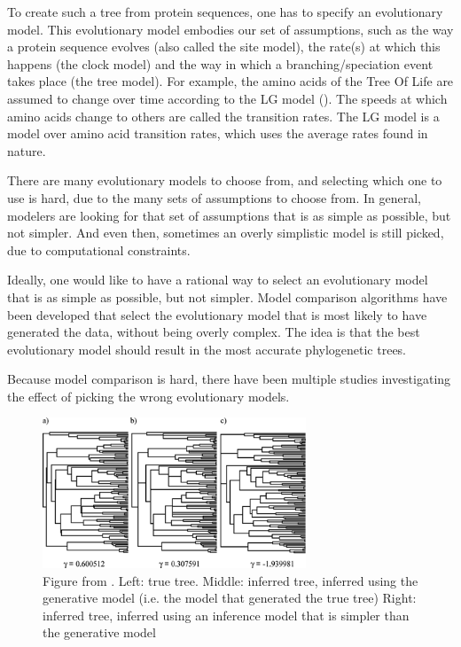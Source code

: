 To create such a tree from protein sequences, one has to specify
an evolutionary model. This evolutionary model embodies our set of
assumptions,
such as the way a protein sequence evolves (also called the site model), 
the rate(s) at which this happens (the clock model) 
and the way in which a branching/speciation event takes 
place (the tree model). 
For example, the amino acids of the Tree Of Life are assumed to change
over time according to the LG model (\cite{le2008improved}).
The speeds at which amino acids change to others are called the transition
rates. The LG model is a model over amino acid transition rates, 
which uses the average rates found in nature.

There are many evolutionary models to choose from, 
and selecting which one to use is hard, due to the many sets of assumptions
to choose from. In general, modelers are looking for that set of assumptions
that is as simple as possible, but not simpler. And even then, sometimes
an overly simplistic model is still picked, due to computational 
constraints. 

Ideally, one would like to have a rational way to select 
an evolutionary model that is as simple as possible, but not simpler.
Model comparison algorithms have been developed that select the evolutionary model that is
most likely to have generated the data, without being overly complex.
The idea is that the best evolutionary model should result in the
most accurate phylogenetic trees.

Because model comparison is hard, there have been multiple
studies investigating the effect of picking the wrong
evolutionary models. 

\begin{figure}[H]
  \includegraphics[width=0.7\textwidth]{revell2005under.png}
  \caption{
    Figure from \cite{revell2005under}. Left: true tree. Middle: inferred tree, inferred using the generative model (i.e. the model that generated the true tree)
    Right: inferred tree, inferred using an inference model that is simpler than the generative model
 }
  \label{fig:revell2005under}
\end{figure}

